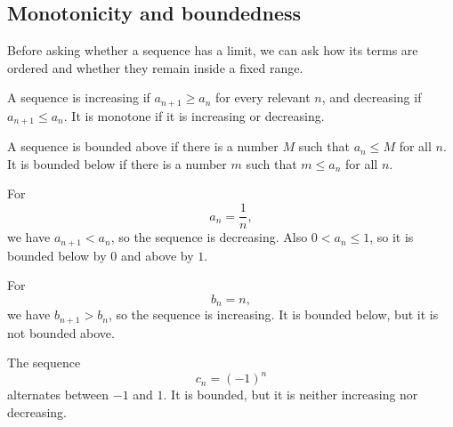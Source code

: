 \subsection{Monotonicity and boundedness}

Before asking whether a sequence has a limit, we can ask how its terms are ordered and whether they remain inside a fixed range.

\begin{definitionbox}
A sequence is increasing if \(a_{n+1}\ge a_n\) for every relevant \(n\), and decreasing if \(a_{n+1}\le a_n\). It is monotone if it is increasing or decreasing.
\end{definitionbox}

\begin{definitionbox}
A sequence is bounded above if there is a number \(M\) such that \(a_n\le M\) for all \(n\). It is bounded below if there is a number \(m\) such that \(m\le a_n\) for all \(n\).
\end{definitionbox}

\begin{examplebox}
For
\[
a_n=\frac1n,
\]
we have \(a_{n+1}<a_n\), so the sequence is decreasing. Also \(0<a_n\le1\), so it is bounded below by \(0\) and above by \(1\).
\end{examplebox}

\begin{examplebox}
For
\[
b_n=n,
\]
we have \(b_{n+1}>b_n\), so the sequence is increasing. It is bounded below, but it is not bounded above.
\end{examplebox}

\begin{examplebox}
The sequence
\[
c_n=(-1)^n
\]
alternates between \(-1\) and \(1\). It is bounded, but it is neither increasing nor decreasing.
\end{examplebox}

